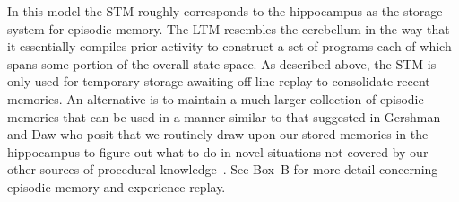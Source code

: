 \documentclass[letterpaper,11pt]{article}
\def\colorred#1{{\color{red}#1}}
\def\urlh#1{{}}
\begin{document}
In this model the STM roughly corresponds to the hippocampus as the storage system for episodic memory. The LTM resembles the cerebellum in the way that it essentially compiles prior activity to construct a set of programs each of which spans some portion of the overall state space. As described above, the STM is only used for temporary storage awaiting off-line replay to consolidate recent memories. An alternative is to maintain a much larger collection of episodic memories that can be used in a manner similar to that suggested in Gershman and Daw who posit that we routinely draw upon our stored memories in the hippocampus to figure out what to do in novel situations not covered by our other sources of procedural knowledge~\cite{GershmanandDawANNUAL-REVIEWS-17}. See {\urlh{box_memories}{Box~\colorred{B}}} for more detail concerning episodic memory and experience replay.





\end{document}
